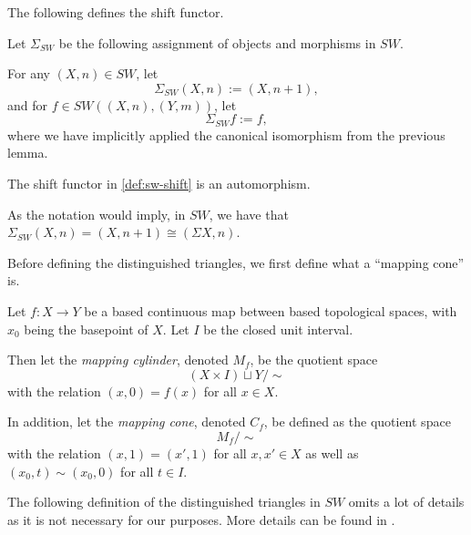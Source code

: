 The following defines the shift functor.
\begin{definition}
    \label{def:sw-shift}
    Let \( \Sigma_{SW} \) be the following assignment of objects and morphisms in \( SW \).

    For any \( (X, n) \in SW \), let
    \[
        \Sigma_{SW} (X, n) := (X, n + 1),
    \] 
    and for \( f \in SW((X, n), (Y, m)) \), let
    \[
        \Sigma_{SW} f := f,
    \]
    where we have implicitly applied the canonical isomorphism from the previous lemma.
\end{definition}

The shift functor in \autoref{def:sw-shift} is an automorphism.

As the notation would imply, in \( SW \), we have that \( \Sigma_{SW} (X, n) = (X, n + 1) \cong ( \Sigma X, n ) \).

Before defining the distinguished triangles, we first define what a ``mapping cone'' is.
\begin{definition}
    Let \( f: X \to Y \) be a based continuous map between based topological spaces, with \( x_0 \) being the basepoint of \( X \). Let \( I \) be the closed unit interval.

    Then let the \emph{mapping cylinder}, denoted \( M_f \), be the quotient space
    \[
        (X \times I) \sqcup Y / \sim
    \]
    with the relation \( (x, 0) = f(x) \) for all \( x \in X \).

    In addition, let the \emph{mapping cone}, denoted \( C_f \), be defined as the quotient space
    \[
        M_f / \sim
    \]
    with the relation \( (x, 1) = (x', 1) \) for all \( x, x' \in X \) as well as \( (x_0, t) \sim (x_0, 0) \) for all \( t \in I \).
\end{definition}

The following definition of the distinguished triangles in \( SW \) omits a lot of details as it is not necessary for our purposes. More details can be found in \cite[Definition 4.7 and 5.8]{Daria_Bachelor}.

